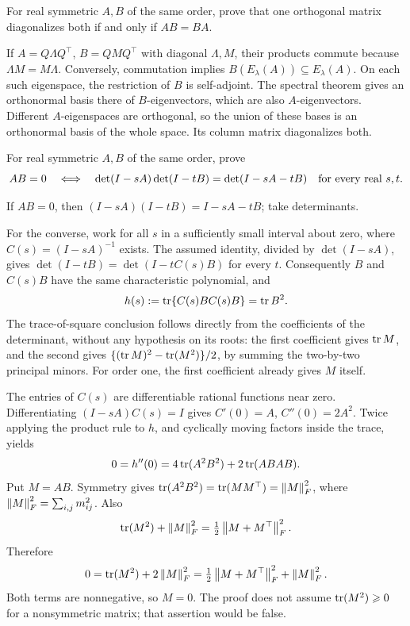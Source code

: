 \begin{problem}\label{ex:09:simultaneous}
For real symmetric \(A,B\) of the same order, prove that one orthogonal
matrix diagonalizes both if and only if \(AB=BA\).
\end{problem}
\begin{solution}
If \(A=Q\Lambda Q^\top\), \(B=QM Q^\top\) with diagonal \(\Lambda,M\),
their products commute because \(\Lambda M=M\Lambda\).
Conversely, commutation implies \(B(E_\lambda(A))\subseteq E_\lambda(A)\).
On each such eigenspace, the restriction of \(B\) is self-adjoint.
The spectral theorem gives an orthonormal basis there of \(B\)-eigenvectors,
which are also \(A\)-eigenvectors. Different \(A\)-eigenspaces are
orthogonal, so the union of these bases is an orthonormal basis of the
whole space. Its column matrix diagonalizes both.
\end{solution}

\begin{problem}\label{ex:09:craig}
For real symmetric \(A,B\) of the same order, prove
\[
 AB=0\quad\Longleftrightarrow\quad
 \det(I-sA)\det(I-tB)=\det(I-sA-tB)
 \quad\hbox{for every real }s,t.
\]
\end{problem}
\begin{solution}
If \(AB=0\), then \((I-sA)(I-tB)=I-sA-tB\); take determinants.

For the converse, work for all \(s\) in a sufficiently small interval
about zero, where \(C(s)=(I-sA)^{-1}\) exists.
The assumed identity, divided by \(\det(I-sA)\), gives
\(\det(I-tB)=\det(I-tC(s)B)\) for every \(t\).
Consequently \(B\) and \(C(s)B\) have the same characteristic polynomial,
and
\[
 h(s):=\operatorname{tr}\{C(s)BC(s)B\}=\operatorname{tr} B^2 .
\]
The trace-of-square conclusion follows directly from the coefficients
of the determinant, without any hypothesis on its roots:
the first coefficient gives \(\operatorname{tr} M\), and the second gives
\(\{(\operatorname{tr} M)^2-\operatorname{tr}(M^2)\}/2\), by summing the two-by-two principal minors.
For order one, the first coefficient already gives \(M\) itself.

The entries of \(C(s)\) are differentiable rational functions near zero.
Differentiating \((I-sA)C(s)=I\) gives
\(C'(0)=A\), \(C''(0)=2A^2\).
Twice applying the product rule to \(h\), and cyclically moving factors
inside the trace, yields
\[
 0=h''(0)=4\operatorname{tr}(A^2B^2)+2\operatorname{tr}(ABAB).
\]
Put \(M=AB\). Symmetry gives \(\operatorname{tr}(A^2B^2)=\operatorname{tr}(MM^\top)=\left\lVert M\right\rVert_F^2\),
where \(\left\lVert M\right\rVert_F^2=\sum_{i,j}m_{ij}^2\).
Also
\[
 \operatorname{tr}(M^2)+\left\lVert M\right\rVert_F^2=\tfrac12\left\lVert M+M^\top\right\rVert_F^2.
\]
Therefore
\[
 0=\operatorname{tr}(M^2)+2\left\lVert M\right\rVert_F^2
   =\tfrac12\left\lVert M+M^\top\right\rVert_F^2+\left\lVert M\right\rVert_F^2.
\]
Both terms are nonnegative, so \(M=0\).
The proof does not assume \(\operatorname{tr}(M^2)\geqslant0\) for a nonsymmetric
matrix; that assertion would be false.
\end{solution}

